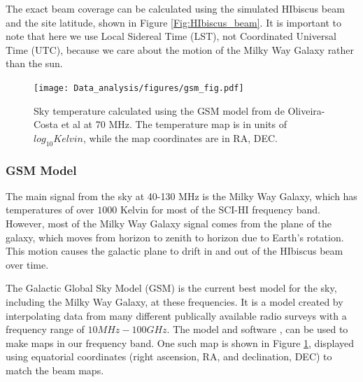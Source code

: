 The exact beam coverage can be calculated using the simulated HIbiscus beam and the site latitude, shown in Figure \ref{Fig:HIbiscus_beam}.  It is important to note that here we use Local Sidereal Time (LST), not Coordinated Universal Time (UTC), because we care about the motion of the Milky Way Galaxy rather than the sun.  

\begin{figure}[htb]
\begin{center}
\texttt{[image: Data\_analysis/figures/gsm\_fig.pdf]}
\caption{Sky temperature calculated using the GSM model from de Oliveira-Costa et al \cite{GSM_model} at 70 MHz. The temperature map is in units of $log_{10} Kelvin$, while the map coordinates are in RA, DEC. }
\label{Fig:GSM_model}
\end{center}
\end{figure}

\subsubsection{GSM Model}\label{Sec:GSM}

The main signal from the sky at 40-130 MHz is the Milky Way Galaxy, which has temperatures of over $1000$ Kelvin for most of the SCI-HI frequency band. However, most of the Milky Way Galaxy signal comes from the plane of the galaxy, which moves from horizon to zenith to horizon due to Earth's rotation. This motion causes the galactic plane to drift in and out of the HIbiscus beam over time. 

The Galactic Global Sky Model (GSM) is the current best model for the sky, including the Milky Way Galaxy, at these frequencies. It is a model created by interpolating data from many different publically available radio surveys with a frequency range of $10 MHz - 100 GHz$. The model and software \cite{GSM_model}, can be used to make maps in our frequency band. One such map is shown in Figure \ref{Fig:GSM_model}, displayed using equatorial coordinates (right ascension, RA, and declination, DEC) to match the beam maps. 

